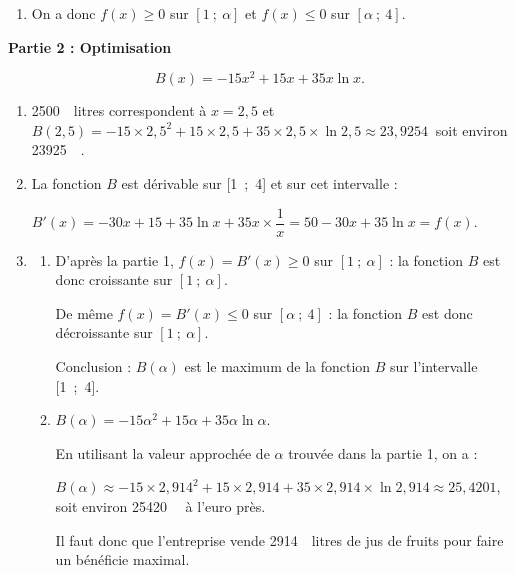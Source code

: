 \documentclass[10pt]{article}
\providecommand{\euro}{\texteuro}
\providecommand{\np}[2][]{{#2~#1}}
\providecommand{\euro}{{\text{€}}}
\renewcommand{\euro}{\ifmmode\text{\texteuro}\else\texteuro\fi}
\begin{document}
\begin{enumerate}
Comme $0 \in \left[f\left(\frac{7}{6}\right)~;~f(4)\right]$, il existe d'après le théorème des valeurs intermédiaires, un réel unique $\alpha$ de cet intervalle tel que $f(\alpha) = 0$.

$\bullet~~$On a $f(2) \approx 14,26$ et $f(3)\approx -1,54$, donc $2 < \alpha < 3$ ;

$\bullet~~$On a $f(2,9) \approx 0,26$ et $f(3,0)\approx -1,54$, donc $2,9 < \alpha < 3,0$ ;

$\bullet~~$On a $f(2,91) \approx 0,09$ et $f(2,92)\approx -0,09$, donc $2,91 < \alpha < 2,92$ ;

$\bullet~~$On a $f(2,914) \approx 0,0013$ et $f(2,915)\approx -0,005$, donc $2,914 < \alpha < 2,915$.
\item  
On a donc $f(x) \geqslant 0$ sur $[1~;~\alpha]$ et $f(x) \leqslant 0$ sur $[\alpha~;~4]$.
\end{enumerate}

\bigskip

\textbf{Partie 2 : Optimisation}

\medskip



\[B(x) = - 15x^2 + 15x +35x \ln x.\]

\begin{enumerate}
\item 


\np{2500}~litres correspondent à $x = 2,5$ et $B(2,5) = - 15 \times 2,5^2 + 15 \times 2,5 + 35 \times 2,5 \times \ln 2,5 \approx \np{23,9254}$ soit environ \np{23925}~\euro.
\item 
La fonction $B$ est dérivable sur [1~;~4] et sur cet intervalle :

$B'(x) = - 30x + 15 + 35\ln x + 35x \times \dfrac{1}{x} = 50 - 30x + 35\ln x = f(x)$.
\item 
	\begin{enumerate}
		\item 
D'après la partie 1, $f(x) = B'(x) \geqslant  0$ sur $[1~;~\alpha]$ : la fonction $B$ est donc croissante sur $[1~;~\alpha]$.

De même $f(x) = B'(x) \leqslant  0$ sur $[\alpha~;~4]$ : la fonction $B$ est donc décroissante sur $[1~;~\alpha]$.

Conclusion : $B(\alpha)$ est le maximum de la fonction $B$ sur l'intervalle [1~;~4].
		\item 
$B(\alpha) = - 15\alpha^2 + 15\alpha + 35\alpha \ln \alpha$.

En utilisant la valeur approchée de $\alpha$ trouvée dans la partie 1, on a :

$B(\alpha) \approx - 15 \times 2,914^2 + 15 \times 2,914 + 35 \times 2,914 \times \ln 2,914 \approx 25,4201$, soit environ \np{25420}~\euro{} à l'euro près.

Il faut donc que l'entreprise vende \np{2914}~litres de jus de fruits pour faire un bénéficie maximal.
	\end{enumerate}
\end{enumerate}
\end{document}
